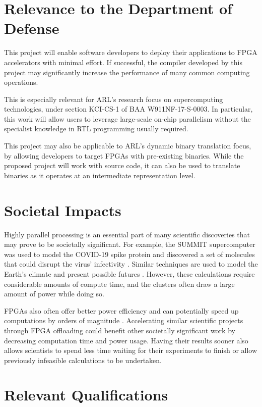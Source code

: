 \documentclass[11pt]{article}
\begin{document}
\section{Relevance to the Department of Defense}

This project will enable software developers to deploy their applications to FPGA accelerators with minimal effort.
If successful, the compiler developed by this project may significantly increase the performance of many common computing operations.

This is especially relevant for ARL's research focus on supercomputing technologies, under section KCI-CS-1 of BAA W911NF-17-S-0003.
In particular, this work will allow users to leverage large-scale on-chip parallelism without the specialist knowledge in RTL programming usually required.

This project may also be applicable to ARL's dynamic binary translation focus, by allowing developers to target FPGAs with pre-existing binaries.
While the proposed project will work with source code, it can also be used to translate binaries as it operates at an intermediate representation level.

\section{Societal Impacts}

Highly parallel processing is an essential part of many scientific discoveries that may prove to be societally significant.
For example, the SUMMIT supercomputer was used to model the COVID-19 spike protein and discovered a set of molecules that could disrupt the virus’ infectivity \cite{smith2020repurposing}.
Similar techniques are used to model the Earth's climate and present possible futures \cite{mizielinski2014high}.
However, these calculations require considerable amounts of compute time, and the clusters often draw a large amount of power while doing so.

FPGAs also often offer better power efficiency and can potentially speed up computations by orders of magnitude \cite{asano2009performance}.
Accelerating similar scientific projects through FPGA offloading could benefit other societally significant work by decreasing computation time and power usage.
Having their results sooner also allows scientists to spend less time waiting for their experiments to finish or allow previously infeasible calculations to be undertaken.

\section{Relevant Qualifications}
\end{document}
